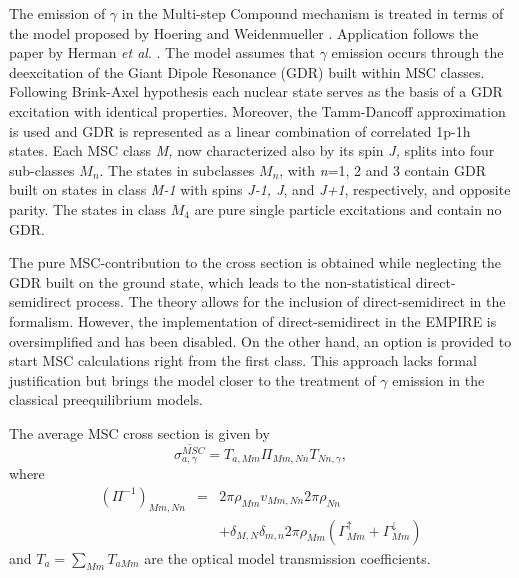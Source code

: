\documentclass[twocolumn,amsmath,amssymb,10pt,groupedaddress,letter]{revtex4}
\begin{document}
The emission of $\gamma$ in the Multi-step Compound mechanism
is treated in terms of the model proposed by Hoering and Weidenmueller
\cite{GammaMSC}. Application follows the paper by Herman \emph{et
al}. \cite{GammaMSCapp}. The model assumes that $\gamma$ emission
occurs through the deexcitation of the Giant Dipole Resonance (GDR)
built within MSC classes. Following Brink-Axel hypothesis
\cite{Axel,Brink,Brinka} each nuclear state serves as the basis of
a GDR excitation with identical properties. Moreover, the Tamm-Dancoff
approximation is used and GDR is represented as a linear combination
of correlated 1p-1h states. Each MSC class \emph{M,} now characterized
also by its spin \emph{J,} splits into four sub-classes $M_{n}$.
The states in subclasses $M_{n}$, with \emph{n}=1, 2 and 3 contain
GDR built on states in class \emph{M-1} with spins \emph{J-1, J},
and \emph{J+1}, respectively, and opposite parity. The states in class
$M_{4}$ are pure single particle excitations and contain no GDR.

The pure MSC-contribution to the cross section is obtained while neglecting
the GDR built on the ground state, which leads to the non-statistical
direct-semidirect process. The theory \cite{GammaMSC} allows for
the inclusion of direct-semidirect in the formalism. However, the
implementation of direct-semidirect in the EMPIRE is oversimplified
and has been disabled. On the other hand, an option is provided to
start MSC calculations right from the first class. This
approach lacks formal justification but brings the model closer to
the treatment of $\gamma$ emission in the classical preequilibrium
models.

The average MSC cross section is given by \begin{equation}
\overline{\sigma_{a,\gamma}^{MSC}}=T_{a,Mm}\Pi_{Mm,Nn}T_{Nn,\gamma},\label{GammaMSCxs}\end{equation}
where \begin{eqnarray}
(\Pi^{-1})_{Mm,Nn} & = & 2\pi\rho_{Mm}v_{Mm,Nn}2\pi\rho_{Nn}\nonumber \\
 &  & +\delta_{M,N}\delta_{m,n}2\pi\rho_{Mm}(\Gamma_{Mm}^{\uparrow}+\Gamma_{Mm}^{\downarrow})\label{Pigamma}\end{eqnarray}
and $T_{a}=\sum_{Mm}T_{aMm}$ are the optical model transmission coefficients.
\end{document}

